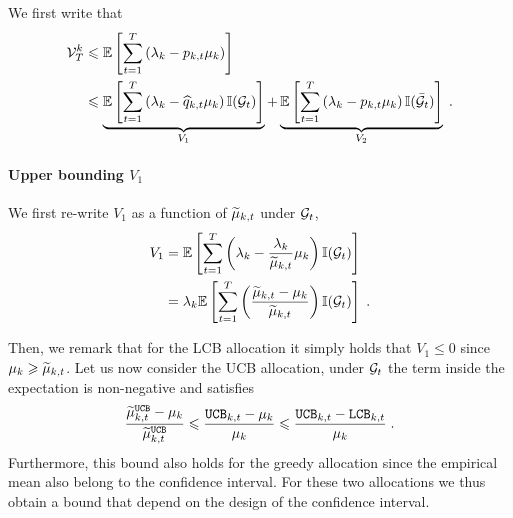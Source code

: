 We first write that 
\begin{align*}
\mathcal{V}_T^k &\leqslant \mathbb{E}\left[\sum_{t=1}^T \left(\lambda_k-p_{k, t} \mu_k \right)\right] \\
&
\leqslant  \underbrace{\mathbb{E}\left[\sum_{t=1}^T \left(\lambda_k-\widehat{q}_{k,t} \mu_k \right) \mathbb{I}(\mathcal{G}_t)\right]}_{V_1} + \underbrace{\mathbb{E}\left[\sum_{t=1}^T \left(\lambda_k-p_{k, t} \mu_k \right) \mathbb{I}(\bar {\mathcal{G}}_t)\right]}_{V_2} \;. \\
\end{align*}


\paragraph{Upper bounding $V_1$} We first re-write $V_1$ as a function of $\widetilde{\mu}_{k, t}$ under $\mathcal{G}_t$, 
\begin{align*}
V_1 & = \mathbb{E}\left[\sum_{t=1}^T \left(\lambda_k- \frac{\lambda_k}{\widetilde{\mu}_{k, t}} \mu_k \right) \mathbb{I}(\mathcal{G}_t)\right] \\
& = \lambda_k \mathbb{E}\left[\sum_{t=1}^T \left(\frac{\widetilde{\mu}_{k,t}-\mu_k}{\widetilde{\mu}_{k,t}}\right) \mathbb{I}(\mathcal{G}_t)\right]\;.
\end{align*}


Then, we remark that for the LCB allocation it simply holds that $V_1\leq 0$ since $\mu_k\geqslant \widetilde{\mu}_{k,t}$. Let us now consider the UCB allocation, under $\mathcal{G}_t$ the term inside the expectation is non-negative and satisfies 
\[\frac{\widetilde{\mu}_{k,t}^{\texttt{UCB}}-\mu_k}{\widetilde{\mu}_{k,t}^{\texttt{UCB}}} \leqslant \frac{\texttt{UCB}_{k,t}-\mu_k}{\mu_k} \leqslant \frac{\texttt{UCB}_{k,t}-\texttt{LCB}_{k, t}}{\mu_k} \;. \]
Furthermore, this bound also holds for the greedy allocation since the empirical mean also belong to the confidence interval. For these two allocations we thus obtain a bound that depend on the design of the confidence interval. 

